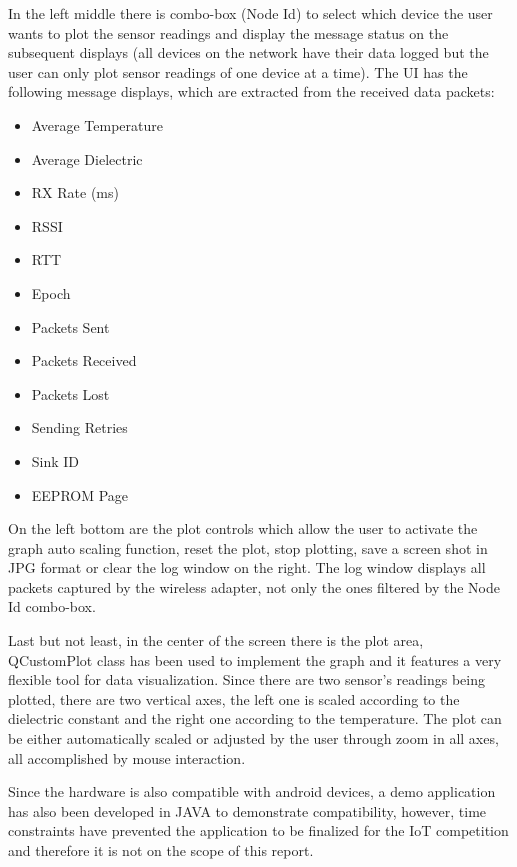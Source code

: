 \documentclass[12pt]{article}
\begin{document}
In the left middle there is combo-box (Node Id) to select which device the user wants to plot the sensor readings and display the message status on the subsequent displays (all devices on the network have their data logged but the user can only plot sensor readings of one device at a time). The UI has the following message displays, which are extracted from the received data packets:
\begin{itemize}
\item Average Temperature
\item Average Dielectric
\item RX Rate (ms)
\item RSSI
\item RTT
\item Epoch
\item Packets Sent
\item Packets Received
\item Packets Lost
\item Sending Retries
\item Sink ID
\item EEPROM Page
\end{itemize}

On the left bottom are the plot controls which allow the user to activate the graph auto scaling function, reset the plot, stop plotting, save a screen shot in JPG format or clear the log window on the right. The log window displays all packets captured by the wireless adapter, not only the ones filtered by the Node Id combo-box.

Last but not least, in the center of the screen there is the plot area, QCustomPlot class has been used to implement the graph and it features a very flexible tool for data visualization. Since there are two sensor's readings being plotted, there are two vertical axes, the left one is scaled according to the dielectric constant and the right one according to the temperature. The plot can be either automatically scaled or adjusted by the user through zoom in all axes, all accomplished by mouse interaction.

Since the hardware is also compatible with android devices, a demo application has also been developed in JAVA to demonstrate compatibility, however, time constraints have prevented the application to be finalized for the IoT competition and therefore it is not on the scope of this report.

\newpage
\end{document}
